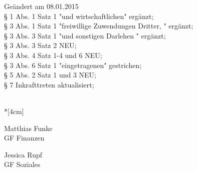 Geändert am 08.01.2015 \\
§ 1 Abs. 1 Satz 1 "und wirtschaftlichen" ergänzt;\\
§ 3 Abs. 1 Satz 1 "freiwillige Zuwendungen Dritter, " ergänzt;\\
§ 3 Abs. 3 Satz 1 "und sonstigen Darlehen " ergänzt;\\
§ 3 Abs. 3 Satz 2 NEU;\\
§ 3 Abs. 4 Satz 1-4 und 6 NEU;\\
§ 3 Abs. 6 Satz 1 "eingetragenen" gestrichen;\\
§ 5 Abs. 2 Satz 1 und 3 NEU;\\
§ 7 Inkrafttreten aktualisiert;


\normalsize
~\\*[4cm]
\begin{center}
\hspace*{\fill}
\parbox{7cm}{Matthias Funke\\GF Finanzen}
\hfill\parbox{7cm}{Jessica Rupf\\GF Soziales}
\hspace*{\fill}
\end{center}